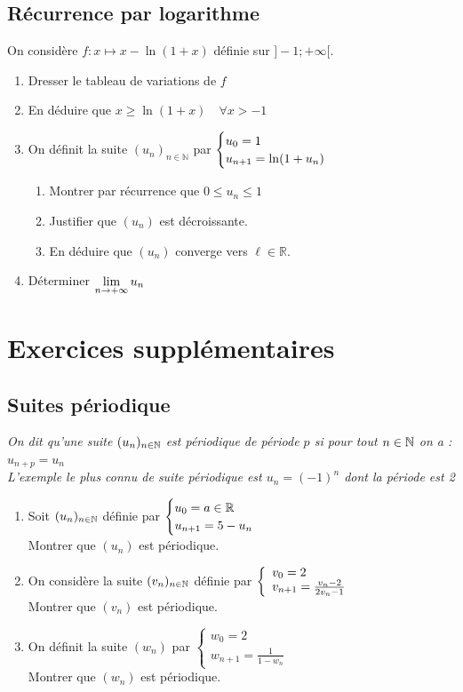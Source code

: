 \documentclass[oneside,12pt]{book}          %
\begin{document}
\subsection{Récurrence par logarithme}
On considère $f : x \mapsto x - \ln(1 + x)$ définie sur $]-1; +\infty[$.
\begin{enumerate}
    \item Dresser le tableau de variations de $f$
    \item En déduire que $x \geq \ln(1 + x) \quad \forall x > -1$
    \item On définit la suite $(u_n)_{n \in \mathbb{N}}$ par $\defsuite{u_0=1}{\ln(1+u_n)}$
    \begin{enumerate}
        \item Montrer par récurrence que $0 \leq u_n \leq 1$
        \item Justifier que $(u_n)$ est décroissante.
        \item En déduire que $(u_n)$ converge vers $\ell \in \mathbb{R}$.
    \end{enumerate}
    \item Déterminer ${\lim\limits_{n\to +\infty}}\, u_n$
\end{enumerate}



\section{Exercices supplémentaires}

\subsection{Suites périodique}
\textit{On dit qu'une suite ${(u_{n})_{n\in\mathbb N}}$ est périodique de période $p$ si pour tout ${n\in\mathbb N}$ on a : $u_{n+p}=u_n$ \\
L'exemple le plus connu de suite périodique est $u_n=(-1)^n$ dont la période est 2}
\begin{enumerate}
    \item Soit ${(u_{n})_{n\in\mathbb N}}$ définie par $\defsuite{u_0=a\in\RR}{5-u_n}$\\
    Montrer que $(u_n)$ est périodique.
    \item On considère la suite $(v_n)_{{n\in\mathbb N}}$ définie par $\accol{v_0=2\\v_{n+1}=\frac{v_n-2}{2v_n-1}}$\\
    Montrer que $(v_n)$ est périodique.
    \item On définit la suite $(w_n)$ par $\begin{cases}w_0=2\\w_{n+1}=\frac{1}{1-w_n}\end{cases}$\\
    Montrer que $(w_n)$ est périodique.
\end{enumerate}
\end{document}
